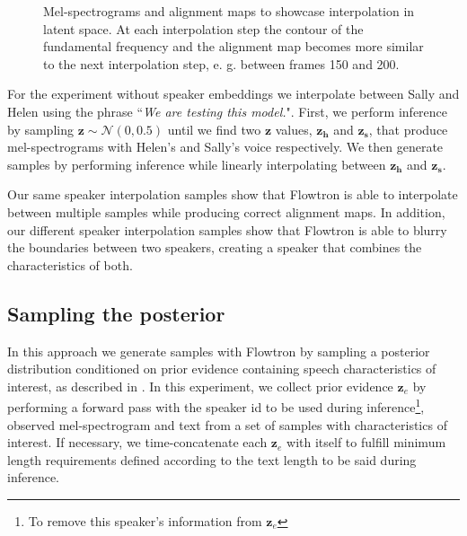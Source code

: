 \documentclass{article}
\begin{document}
\begin{figure}[!ht]
    \centering
    
    
    
    
    \caption{Mel-spectrograms and alignment maps to showcase interpolation in latent space. At each interpolation step the contour of the fundamental frequency and the alignment map becomes more similar to the next interpolation step, e. g. between frames 150 and 200.}
    \label{fig:interpolation}
\end{figure}
\fi

For the experiment without speaker embeddings we interpolate between Sally and Helen using the phrase ``\textit{We are testing this model.}". First, we perform inference by sampling $\boldsymbol{z} \sim \mathcal{N}(0, 0.5)$ until we find two $\boldsymbol{z}$ values, $\boldsymbol{z_h}$ and $\boldsymbol{z_s}$, that produce mel-spectrograms with Helen's and Sally's voice respectively. We then generate samples by performing inference while linearly interpolating between $\boldsymbol{z_h}$ and $\boldsymbol{z_s}$. 

Our same speaker interpolation samples show that Flowtron is able to interpolate between multiple samples while producing correct alignment maps. In addition, our different speaker interpolation samples show that Flowtron is able to blurry the boundaries between two speakers, creating a speaker that combines the characteristics of both. \subsection{Sampling the posterior}\label{sec:sampling_posterior}
In this approach we generate samples with Flowtron by sampling a posterior distribution conditioned on prior evidence containing speech characteristics of interest, as described in \cite{gambardella2019transflow,kingma2018glow}. In this experiment, we collect prior evidence $\boldsymbol{z}_{e}$ by performing a forward pass with the speaker id to be used during inference\footnote{To remove this speaker's information from $\boldsymbol{z}_{e}$}, observed mel-spectrogram and text from a set of samples with characteristics of interest. If necessary, we time-concatenate each $\boldsymbol{z}_{e}$ with itself to fulfill minimum length requirements defined according to the text length to be said during inference. 
\end{document}
